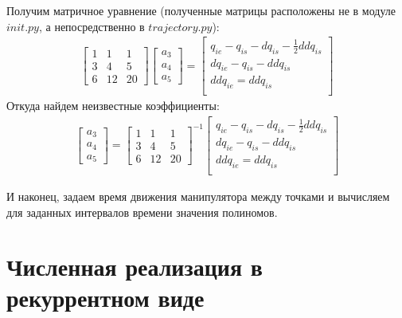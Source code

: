 \documentclass[a4paper,14pt]{extreport}
\begin{document}
Получим матричное уравнение (полученные матрицы расположены не в модуле $init.py$, а непосредственно в $trajectory.py$):
\begin{align*}
\begin{bmatrix}
1&1&1\\
3&4&5\\
6& 12& 20
\end{bmatrix}
\begin{bmatrix}
a_3\\
a_4\\
a_5
\end{bmatrix}
=
\begin{bmatrix}
q_{ie} - q_{is} - dq_{is} - \frac{1}{2} ddq_{is}\\
dq_{ie} - q_{is} - ddq_{is}\\
ddq_{ie} = ddq_{is}\\
\end{bmatrix}
\end{align*}
Откуда найдем неизвестные коэффициенты:
\begin{align*}
\begin{bmatrix}
a_3\\
a_4\\
a_5
\end{bmatrix}
=
\begin{bmatrix}
1&1&1\\
3&4&5\\
6& 12& 20
\end{bmatrix}^{-1}
\begin{bmatrix}
q_{ie} - q_{is} - dq_{is} - \frac{1}{2} ddq_{is}\\
dq_{ie} - q_{is} - ddq_{is}\\
ddq_{ie} = ddq_{is}\\
\end{bmatrix}
\end{align*}

И наконец, задаем время движения манипулятора между точками и вычисляем для заданных интервалов времени значения полиномов.


\section{Численная реализация в рекуррентном виде}
\end{document}
